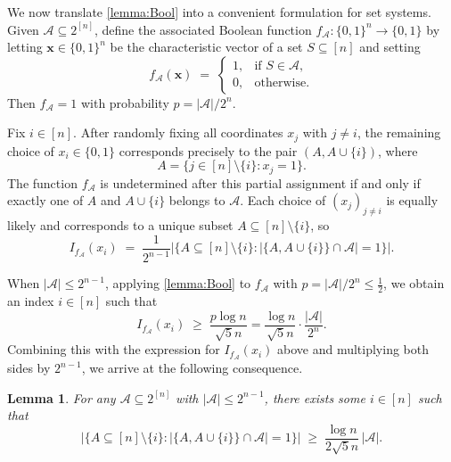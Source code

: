 \documentclass[11pt]{article}
\newtheorem{lemma}[theorem]{Lemma}
\theoremstyle{definition}
\begin{document}
We now translate \cref{lemma:Bool} into a convenient formulation for set systems.  
Given \(\mathcal{A}\subseteq 2^{[n]}\), define the associated Boolean function
\(f_{\mathcal{A}}:\{0,1\}^n\to\{0,1\}\) by letting \(\bm{x}\in\{0,1\}^n\) be the characteristic vector of a set \(S\subseteq[n]\) and setting
\[
   f_{\mathcal{A}}(\bm{x})
   \;=\;
   \begin{cases}
      1, & \text{if } S\in\mathcal{A},\\[2pt]
      0, & \text{otherwise}.
   \end{cases}
\]
Then \(f_{\mathcal{A}}=1\) with probability
\(
   p = |\mathcal{A}|/2^n.
\)

Fix \(i\in[n]\). After randomly fixing all coordinates \(x_j\) with \(j\neq i\), the remaining choice of \(x_i\in\{0,1\}\) corresponds precisely to the pair \((A, A\cup\{i\})\), where
\[
   A = \{j\in[n]\setminus\{i\} : x_j = 1\}.
\]
The function \(f_{\mathcal{A}}\) is undetermined after this partial assignment if and only if exactly one of \(A\) and \(A\cup\{i\}\) belongs to \(\mathcal{A}\). Each choice of \((x_j)_{j\neq i}\) is equally likely and corresponds to a unique subset \(A\subseteq [n]\setminus\{i\}\), so
\[
   I_{f_{\mathcal{A}}}(x_i)
   \;=\;
   \frac{1}{2^{n-1}}
   \bigl|\{A\subseteq[n]\setminus\{i\} :
        |\{A, A\cup\{i\}\}\cap\mathcal{A}|=1\}\bigr|.
\]

When \(|\mathcal{A}|\le 2^{n-1}\), applying \cref{lemma:Bool} to \(f_{\mathcal{A}}\) with \(p = |\mathcal{A}|/2^n\le\frac{1}{2}\), we obtain an index \(i\in[n]\) such that
\[
   I_{f_{\mathcal{A}}}(x_i)
   \;\ge\;
   \frac{p\log n}{\sqrt{5}n}
   =
   \frac{\log n}{\sqrt{5}n}\cdot\frac{|\mathcal{A}|}{2^n}.
\]
Combining this with the expression for \(I_{f_{\mathcal{A}}}(x_i)\) above and multiplying both sides by \(2^{n-1}\), we arrive at the following consequence.

\begin{lemma}\label{lem:KKL}
    For any
    \(\mathcal{A}\subseteq 2^{[n]}\) with \(|\mathcal{A}|\le 2^{n-1}\),
    there exists some \(i\in [n]\) such that
    \[
        \bigl|\{A\subseteq [n]\setminus\{i\}:
               |\{A, A\cup\{i\}\}\cap\mathcal{A}|=1\}\bigr|
        \;\ge\; \frac{\log n}{2\sqrt{5}n}\,|\mathcal{A}|.
    \]
\end{lemma}
\end{document}
